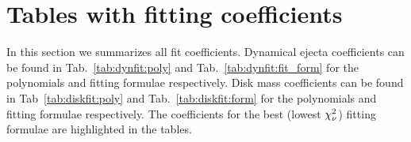 


\section{Tables with fitting coefficients}\label{app:coefs}

In this section we summarizes all fit coefficients.
Dynamical ejecta coefficients can be found in 
Tab.~\ref{tab:dynfit:poly} and 
Tab.~\ref{tab:dynfit:fit_form} for the polynomials and fitting
formulae respectively.
Disk mass coefficients can be found in 
Tab~\ref{tab:diskfit:poly} and 
Tab.~\ref{tab:diskfit:form} for the polynomials and fitting
formulae respectively.
The coefficients for the best (lowest $\chi_{\nu}^2{}$) 
fitting formulae are highlighted in the tables.


  
